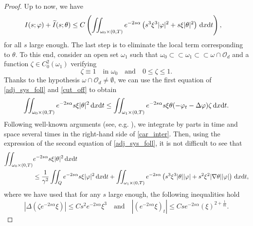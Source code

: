 \documentclass{aims}
\theoremstyle{definition}
\def\dx{\,\textnormal{d}x}
\def\dt{\textnormal{d}t}
\begin{document}
\begin{proof}
Up to now, we have 
%
\begin{equation}\label{est_locales}
\begin{split}
I(s;\varphi)+\widetilde{I}(s;\theta)\leq C&\left(\iint_{\omega_0\times(0,T)}e^{-2s\alpha}\left(s^3\xi^3|\varphi|^2+s\xi|\theta|^2\right)\dx\dt \right),
\end{split}
\end{equation}
%
for all $s$ large enough. The last step is to eliminate the local term corresponding to $\theta$. To this end, consider an open set $\omega_1$ such that $\omega_0\subset\subset\omega_1\subset \subset \omega\cap \mathcal O_d$ and a function $\zeta\in C_0^2(\omega_1)$ verifying 
%
\begin{equation}\label{cut_off}
\zeta\equiv 1\quad \text{in } \omega_0 \quad \text{and} \quad 0\leq \zeta\leq 1. 
\end{equation}
%
Thanks to the hypothesis $\omega\cap\mathcal O_d\neq \emptyset$, we can use the first equation of \eqref{adj_sys_foll} and \eqref{cut_off} to obtain
%
\begin{equation}\label{car_inter}
\iint_{\omega_0\times(0,T)}e^{-2s\alpha}s\xi|\theta|^2\dx\dt\leq \iint_{\omega_1\times(0,T)}e^{-2s\alpha}s\xi \theta(-\varphi_t-\Delta \varphi)\zeta\dx\dt.
\end{equation}
%
Following well-known arguments (see, e.g. \cite{luz_manuel,deteresa2000}), we integrate by parts in time and space several times in the right-hand side of \eqref{car_inter}. Then, using the expression of the second equation of \eqref{adj_sys_foll}, it is not difficult to see that 
%
\begin{equation}\label{inter_res}
\begin{split}
\iint_{\omega_0\times(0,T)}&e^{-2s\alpha}s\xi|\theta|^2\dx\dt\\
&\leq \frac{1}{\gamma^2}\iint_{Q}e^{-2s\alpha}s\xi |\varphi|^2\dx\dt+\iint_{\omega_1\times(0,T)}e^{-2s\alpha}\left(s^3\xi^3|\theta| |\varphi|+s^2\xi^2|\nabla \theta||\varphi|\right)\dx\dt,
\end{split}
\end{equation}
%
where we have used that for any $s$ large enough, the following inequalities hold
%
\begin{equation*}
|\Delta(\zeta e^{-2s\alpha}\xi)|\leq Cs^2e^{-2s\alpha}\xi^3 \quad \text{and}\quad |(e^{-2s\alpha}\xi)_t|\leq Cse^{-2s\alpha}(\xi)^{2+\frac{1}{m}}.
\end{equation*}
%


\end{proof}
\end{document}
